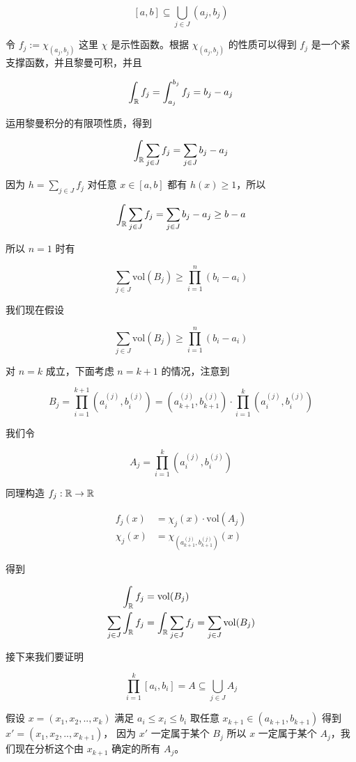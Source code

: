 \[
    [a,b] \subseteq \bigcup_{j \in J}(a_j, b_j)
\]

令 $f_j := \chi_{(a_j, b_j)}$ 这里 $\chi$ 是示性函数。根据 $\chi_{(a_j, b_j)}$  的性质可以得到 $f_j$ 是一个紧支撑函数，并且黎曼可积，并且

\[
\int_{\mathbb{R}}f_j = \int_{a_j}^{b_j}f_j = b_j - a_j
\]

运用黎曼积分的有限项性质，得到

\[
\int_{\mathbb{R}} \sum_{j \in J} f_j = \sum_{j \in J}b_j - a_j
\]

因为 $h = \sum_{j \in J} f_j$ 对任意 $x \in [a,b]$ 都有 $h(x) \ge 1$，所以 

\[
\int_{\mathbb{R}} \sum_{j \in J} f_j = \sum_{j \in J}b_j - a_j \ge b -a
\]

所以 $n=1$ 时有

\[
\sum_{j \in J} \mathrm{vol}(B_j) \ge \prod_{i=1}^{n}(b_i - a_i)
\]

我们现在假设 


\[
\sum_{j \in J} \mathrm{vol}(B_j) \ge \prod_{i=1}^{n}(b_i - a_i)
\]

对 $n = k$ 成立，下面考虑 $n = k +1$ 的情况，注意到

\[
    B_j = \prod_{i=1}^{k+1}(a_i^{(j)}, b_i^{(j)}) = (a_{k+1}^{(j)}, b_{k+1}^{(j)}) \cdot \prod_{i=1}^{k}(a_i^{(j)}, b_i^{(j)})
\]

我们令 

\[
    A_j = \prod_{i=1}^{k}(a_i^{(j)}, b_i^{(j)})
\]

同理构造 $f_j: \mathbb{R} \to \mathbb{R}$

\begin{align*}
    f_j(x) &= \chi_{j}(x)  \cdot \mathrm{vol}(A_j) \\
\chi_{j}(x) &= \chi_{(a_{k+1}^{(j)}, b_{k+1}^{(j)})}(x) 
\end{align*}

得到

\begin{align*}
    \int_{\mathbb{R}} f_j &= \mathrm{vol}(B_j) \\
    \sum_{j \in J} \int_{\mathbb{R}} f_j &=  \int_{\mathbb{R}}\sum_{j \in J} f_j = \sum_{j \in J} \mathrm{vol}(B_j)
\end{align*}


接下来我们要证明 

\[
\prod_{i=1}^{k}[a_i, b_i] = A \subseteq \bigcup_{j \in J} A_j
\]

假设 $x =(x_1, x_2, .., x_k) $ 满足 $a_i \le x_i \le b_i$ 取任意 $x_{k+1} \in (a_{k+1}, b_{k+1}) $ 
得到 $x' = (x_1, x_2, ..,x_{k+1})$，
因为 $x'$ 一定属于某个 $B_j$ 所以 $x$ 一定属于某个 $A_j$，我们现在分析这个由 $x_{k+1} $ 确定的所有 $A_j$。

